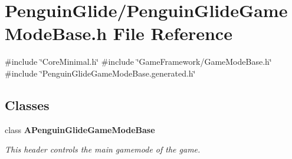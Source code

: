 \section{Penguin\+Glide/\+Penguin\+Glide\+Game\+Mode\+Base.h File Reference}
\label{_penguin_glide_game_mode_base_8h}
{\ttfamily \#include \char`\"{}Core\+Minimal.\+h\char`\"{}}\newline
{\ttfamily \#include \char`\"{}Game\+Framework/\+Game\+Mode\+Base.\+h\char`\"{}}\newline
{\ttfamily \#include \char`\"{}Penguin\+Glide\+Game\+Mode\+Base.\+generated.\+h\char`\"{}}\newline
\subsection*{Classes}
\begin{DoxyCompactItemize}
\item 
class \textbf{ A\+Penguin\+Glide\+Game\+Mode\+Base}
\begin{DoxyCompactList}\small\item\em This header controls the main gamemode of the game. \end{DoxyCompactList}\end{DoxyCompactItemize}
